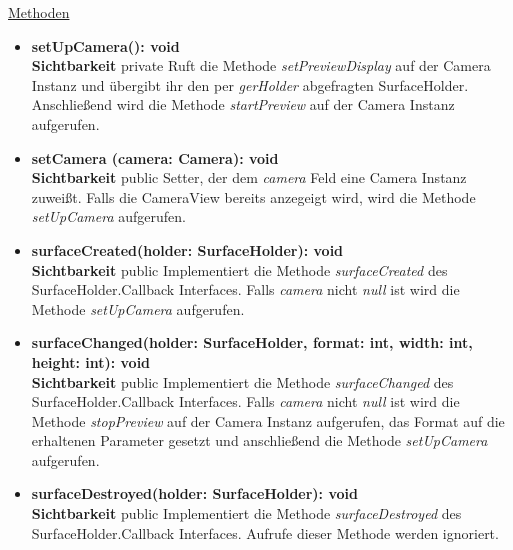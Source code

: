 \underline{Methoden}
\begin{itemize}
\itemsep0pt

\item \textbf{setUpCamera(): void}\hfill\\
\textbf{Sichtbarkeit} private\newline
Ruft die Methode \textit{setPreviewDisplay} auf der Camera Instanz und übergibt ihr den per \textit{gerHolder} abgefragten SurfaceHolder. Anschließend wird die Methode \textit{startPreview} auf der Camera Instanz aufgerufen.

\item \textbf{setCamera (camera: Camera): void}\hfill\\
\textbf{Sichtbarkeit} public\newline
Setter, der dem \textit{camera} Feld eine Camera Instanz zuweißt. Falls die CameraView bereits anzegeigt wird, wird die Methode \textit{setUpCamera} aufgerufen.

\item \textbf{surfaceCreated(holder: SurfaceHolder): void}\hfill\\
\textbf{Sichtbarkeit} public\newline
Implementiert die Methode \textit{surfaceCreated} des SurfaceHolder.Callback Interfaces. Falls \textit{camera} nicht \textit{null} ist wird die Methode \textit{setUpCamera} aufgerufen.

\item \textbf{surfaceChanged(holder: SurfaceHolder, format: int, width: int, height: int): void}\hfill\\
\textbf{Sichtbarkeit} public\newline
Implementiert die Methode \textit{surfaceChanged} des SurfaceHolder.Callback Interfaces. Falls \textit{camera} nicht \textit{null} ist wird die Methode \textit{stopPreview} auf der Camera Instanz aufgerufen, das Format auf die erhaltenen Parameter gesetzt und anschließend die Methode \textit{setUpCamera} aufgerufen.

\item \textbf{surfaceDestroyed(holder: SurfaceHolder): void}\hfill\\
\textbf{Sichtbarkeit} public\newline
Implementiert die Methode \textit{surfaceDestroyed} des SurfaceHolder.Callback Interfaces. Aufrufe dieser Methode werden ignoriert.

\end{itemize}